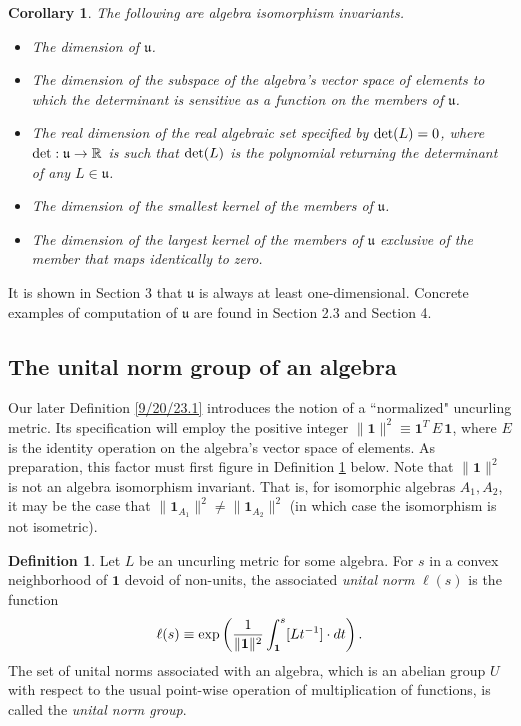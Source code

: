 \documentclass{amsart}
\numberwithin{equation}{section}
\newtheorem{corollary}[theorem]{Corollary}
\theoremstyle{definition}
\newtheorem{definition}[theorem]{Definition}
\numberwithin{theorem}{section}
\begin{document}
  \begin{corollary}\label{8/18/23.2} The following are algebra isomorphism invariants. \begin{itemize} \item The dimension of $\mathfrak{u}$. \item The dimension of the subspace of the algebra's vector space of elements to which the determinant is sensitive as a function on the members of $\mathfrak{u}$. \item The real dimension of the real algebraic set specified by ${\rm det}(L) =0$, where ${\rm det}:\mathfrak{u}\rightarrow \mathbb{R}$ is such that ${\rm det}(L)$ is the polynomial returning the determinant of any $L\in\mathfrak{u}$.  \item The dimension of the smallest kernel of the members of $\mathfrak{u}$.  \item The dimension of the largest kernel of the members of $\mathfrak{u}$ exclusive of the member that maps identically to zero.\end{itemize} \end{corollary}

 It is shown in Section 3 that $\mathfrak{u}$ is always at least one-dimensional.   Concrete examples of computation of $\mathfrak{u}$ are found in Section 2.3 and Section 4.  

\subsection{The unital norm group of an algebra}
  
Our later Definition \ref{9/20/23.1} introduces the notion of a ``normalized" uncurling metric.  Its specification will employ the  positive integer $\|\mathbf{1}\|^2 \equiv \mathbf{1}^T \,E\, \mathbf{1}$, where $E$ is the identity operation on the algebra's vector space of elements. As preparation, this factor must first figure in Definition \ref{9/21/23.2} below.  Note that $\|\mathbf{1}\|^2$ is not an algebra isomorphism invariant.  That is, for isomorphic algebras $A_1,A_2$, it may be the case that $\|\mathbf{1}_{A_1}\|^2 \ne \|\mathbf{1}_{A_2}\|^2$ (in which case the isomorphism is not isometric).

  
  
  \begin{definition}\label{9/21/23.2} Let $L$ be an uncurling metric for some algebra.  For $s$ in a convex neighborhood of $\mathbf{1}$ devoid of non-units, the associated {\it unital norm} $ \ell(s)$ is the function
  \begin{equation}\label{11/7/20.2}   \ell(s) \equiv \exp\left({\frac{1}{\|{\bf 1}\|^2}\int_{\bf 1}^s [Lt^{-1}]\cdot dt}\right).\end{equation} 
   The set of unital norms associated with an algebra, which is an abelian group $U$ with respect to the usual point-wise operation of multiplication of functions, is called the {\it unital norm group}. \end{definition} 
   
\end{document}
